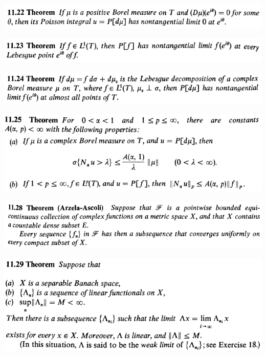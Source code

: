 \documentclass[12pt]{article}
\begin{document}
		\begin{center}
		\includegraphics{11ponto22}
		\end{center}

		\begin{center}
		\includegraphics{11ponto23}
		\end{center}

		\begin{center}
		\includegraphics{11ponto24}
		\end{center}

		\begin{center}
		\includegraphics{11ponto25}
		\end{center}

		\begin{center}
		\includegraphics[scale=0.9]{11ponto28}
		\end{center}

		\begin{center}
		\includegraphics{11ponto29}
		\end{center}
\end{document}
